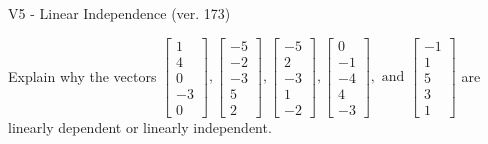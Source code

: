 \begin{exercise}
  \begin{exerciseTitle}V5 - Linear Independence (ver. 173)\end{exerciseTitle}
  \begin{exerciseStatement}
    Explain why the vectors \(\left[\begin{array}{r}
1 \\
4 \\
0 \\
-3 \\
0
\end{array}\right] , \left[\begin{array}{r}
-5 \\
-2 \\
-3 \\
5 \\
2
\end{array}\right] , \left[\begin{array}{r}
-5 \\
2 \\
-3 \\
1 \\
-2
\end{array}\right] , \left[\begin{array}{r}
0 \\
-1 \\
-4 \\
4 \\
-3
\end{array}\right] , \text{ and } \left[\begin{array}{r}
-1 \\
1 \\
5 \\
3 \\
1
\end{array}\right]\) are linearly dependent or linearly independent.	



\end{exerciseStatement}
\end{exercise}
